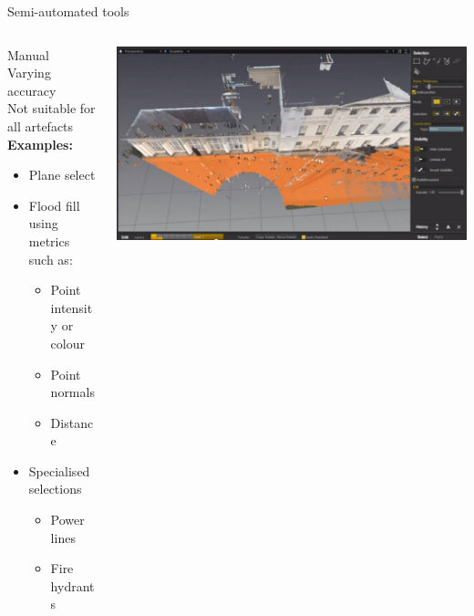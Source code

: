\documentclass{beamer}
\begin{document}
\begin{frame}{Semi-automated tools}

\begin{columns}[T]
\begin{column}{0.5\textwidth}

Manual\\
Varying accuracy\\
Not suitable for all artefacts\\
\textbf{Examples:}
\begin{itemize}
\item Plane select
\item Flood fill using metrics such as:

\begin{itemize}
\item Point intensity or colour
\item Point normals
\item Distance
\end{itemize}

\item Specialised selections
\begin{itemize}
\item Power lines
\item Fire hydrants
\end{itemize}
\end{itemize}

\end{column}
\begin{column}{0.5\textwidth}
\includegraphics[width=1\textwidth]{pics/plane.png}
\end{column}

\end{columns}

\end{frame}
\end{document}

